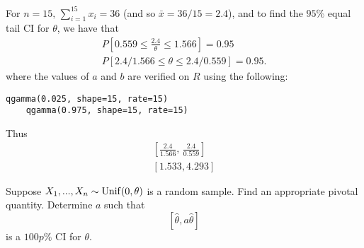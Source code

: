 \documentclass[notoc,notitlepage]{tufte-book}
\begin{document}
\begin{solution}
  For $n = 15, \, \sum_{i=1}^{15} x_i = 36$ (and so $\bar{x} = 36/15 = 2.4$), and to find the $95\%$ equal tail CI for $\theta$, we have that
  \begin{gather*}
    P\left[ 0.559 \leq \frac{2.4}{\theta} \leq 1.566 \right] = 0.95 \\
    P\left[ 2.4/1.566 \leq \theta \leq 2.4/0.559 \right] = 0.95.
  \end{gather*}
  where the values of $a$ and $b$ are verified on $R$ using the following:
  \begin{lstlisting}[caption=R interactive code to get $a$ and $b$]
    qgamma(0.025, shape=15, rate=15)
    qgamma(0.975, shape=15, rate=15)
  \end{lstlisting}
  Thus
  \begin{gather*}
    \left[ \frac{2.4}{1.566}, \, \frac{2.4}{0.559} \right] \\
    \left[ 1.533, 4.293 \right]
  \end{gather*}
\end{solution}

\begin{eg}
  Suppose $X_1, ..., X_n \sim \operatorname{Unif}(0, \theta)$ is a random sample. Find an appropriate pivotal quantity. Determine $a$ such that
  \begin{equation*}
    \left[ \hat{\theta}, a \hat{\theta} \right]
  \end{equation*}
  is a $100p\%$ CI for $\theta$.
\end{eg}
\end{document}
